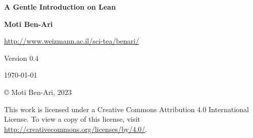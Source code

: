 


\thispagestyle{empty}

\begin{center}
\textbf{\LARGE A Gentle Introduction on Lean}

\bigskip
\bigskip
\bigskip

\textbf{\Large Moti Ben-Ari}

\bigskip

\url{http://www.weizmann.ac.il/sci-tea/benari/}

\bigskip
\bigskip
\bigskip

Version $0.4$

\bigskip

\today

\end{center}

\vfill

\begin{center}
\copyright{} Moti Ben-Ari, $2023$
\end{center}
 
\begin{small}
This work is licensed under a Creative Commons Attribution 4.0 International License. To view a copy of this license, visit \url{http://creativecommons.org/licenses/by/4.0/}.
\end{small}

\newpage

\tableofcontents

\newpage


